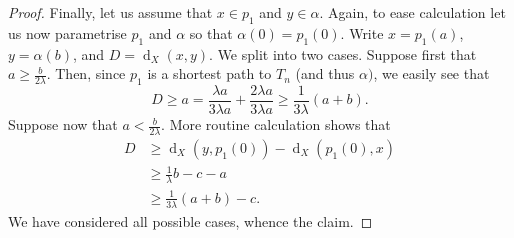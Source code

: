\documentclass[10pt,a4paper]{amsart}
\DeclareMathOperator{\dist}{d}
\begin{document}
\begin{proof}
        Finally, let us assume that $x \in p_1$ and $y \in \alpha$. Again, to ease calculation let us now parametrise $p_1$ and $\alpha$ so that $\alpha(0) = p_1(0)$. Write $x = p_1(a)$, $y = \alpha(b)$, and $D = \dist_X(x,y)$. We split into two cases. Suppose first that $a \geq \frac b{2\lambda}$. Then, since $p_1$ is a shortest path to $T_n$ (and thus $\alpha)$, we easily see that 
        $$
        D  \geq a = \frac{\lambda a}{3\lambda a} + \frac{2\lambda a}{3\lambda a} \geq \frac{1}{3\lambda}(a+b).
        $$
        Suppose now that $a < \frac{b}{2\lambda}$. More routine calculation shows that
        \begin{align*}
            D &\geq \dist_X(y,p_1(0)) - \dist_X(p_1(0),x) \\
            & \geq \frac1 \lambda b - c- a \\
            & \geq \frac 1 {3\lambda}(a+b) -c.
        \end{align*}
        We have considered all possible cases, whence the claim.
    \end{proof}
\end{document}
